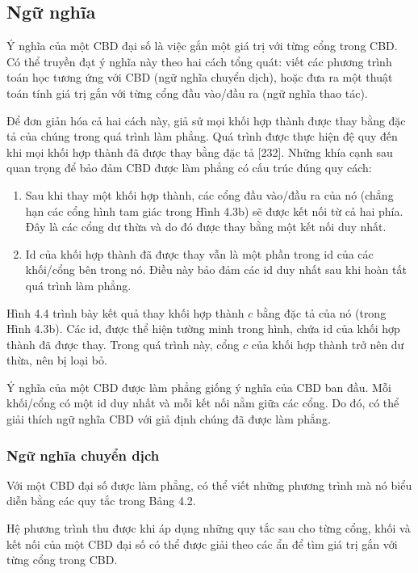 \subsection{Ngữ nghĩa}
Ý nghĩa của một CBD đại số là việc gắn một giá trị với từng cổng trong CBD. Có thể truyền đạt ý nghĩa này theo hai cách tổng quát: viết các phương trình toán học tương ứng với CBD (ngữ nghĩa chuyển dịch), hoặc đưa ra một thuật toán tính giá trị gắn với từng cổng đầu vào/đầu ra (ngữ nghĩa thao tác).

Để đơn giản hóa cả hai cách này, giả sử mọi khối hợp thành được thay bằng đặc tả của chúng trong quá trình làm phẳng. Quá trình được thực hiện đệ quy đến khi mọi khối hợp thành đã được thay bằng đặc tả [232]. Những khía cạnh sau quan trọng để bảo đảm CBD được làm phẳng có cấu trúc đúng quy cách:
\begin{enumerate}
\item Sau khi thay một khối hợp thành, các cổng đầu vào/đầu ra của nó (chẳng hạn các cổng hình tam giác trong Hình 4.3b) sẽ được kết nối từ cả hai phía. Đây là các cổng dư thừa và do đó được thay bằng một kết nối duy nhất.
\item Id của khối hợp thành đã được thay vẫn là một phần trong id của các khối/cổng bên trong nó. Điều này bảo đảm các id duy nhất sau khi hoàn tất quá trình làm phẳng.
\end{enumerate}

Hình 4.4 trình bày kết quả thay khối hợp thành $c$ bằng đặc tả của nó (trong Hình 4.3b). Các id, được thể hiện tường minh trong hình, chứa id của khối hợp thành đã được thay. Trong quá trình này, cổng $c$ của khối hợp thành trở nên dư thừa, nên bị loại bỏ.

Ý nghĩa của một CBD được làm phẳng giống ý nghĩa của CBD ban đầu. Mỗi khối/cổng có một id duy nhất và mỗi kết nối nằm giữa các cổng. Do đó, có thể giải thích ngữ nghĩa CBD với giả định chúng đã được làm phẳng.

\subsubsection{Ngữ nghĩa chuyển dịch}
Với một CBD đại số được làm phẳng, có thể viết những phương trình mà nó biểu diễn bằng các quy tắc trong Bảng 4.2.

Hệ phương trình thu được khi áp dụng những quy tắc sau cho từng cổng, khối và kết nối của một CBD đại số có thể được giải theo các ẩn để tìm giá trị gắn với từng cổng trong CBD.

